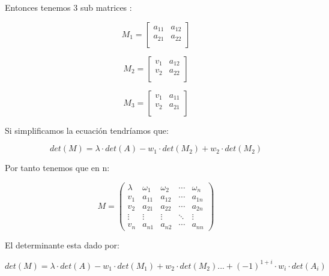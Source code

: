 \documentclass[11pt]{article}
\begin{document}
    Entonces tenemos 3 sub matrices :

\begin{equation}
M_1 =
\begin{bmatrix}
a_{11} & a_{12} \\
a_{21} & a_{22} \\
\end{bmatrix}
\end{equation}

\begin{equation}
M_2 =
\begin{bmatrix}
v_1 & a_{12} \\
v_2 & a_{22} \\
\end{bmatrix}
\end{equation}

\begin{equation}
M_3 =
\begin{bmatrix}
v_1 & a_{11} \\
v_2 & a_{21} \\
\end{bmatrix}
\end{equation}

    Si simplificamos la ecuación tendríamos que:

\begin{equation}
det(M) =
\lambda \cdot
det(A)
-
w_1 \cdot det(M_2)
+
w_2 \cdot det(M_2)
\end{equation}

    Por tanto tenemos que en n:

\begin{equation}
M =
\begin{pmatrix}
\lambda & \omega_1 & \omega_2 & \cdots & \omega_n \\
v_1 & a_{11} & a_{12} & \cdots & a_{1n} \\
v_2 & a_{21} & a_{22} & \cdots & a_{2n} \\
\vdots & \vdots & \vdots & \ddots & \vdots \\
v_n & a_{n1} & a_{n2} & \cdots & a_{nn}
\end{pmatrix}
\end{equation}

El determinante esta dado por:

\begin{equation}
det(M) =
\lambda \cdot
det(A)
-
w_1 \cdot det(M_1)
+
w_2 \cdot det(M_2) ... + (-1)^{1+i} \cdot w_i \cdot det(A_i)
\end{equation}
\end{document}
